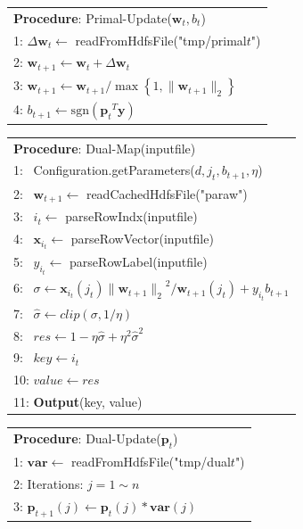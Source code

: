 \documentclass[10pt, conference, compsocconf]{IEEEtran}
\newcommand{\bw}{\mathbf{w}}
\newcommand{\bp}{\mathbf{p}}
\newcommand{\lc}{\left(}
\newcommand{\rc}{\right)}
\newcommand{\tspace}{\hspace*{2em}}
\def\sgn{\mathrm{sgn}}
\begin{document}
    \begin{table}[ht]
	\begin{tabular}{l}
	\hline\noalign{\smallskip}
	\textbf{Procedure}: Primal-Update($\bw_t, b_t$) \\
	\noalign{\smallskip}
	\hline
	\noalign{\smallskip}
    1:  $\Delta \bw_t \leftarrow$ readFromHdfsFile("tmp/primal$t$") \\
    2:  $\bw_{t+1} \leftarrow \bw_t+\Delta \bw_t$ \\
	3:	${\bw}_{t+1}\leftarrow {\bw}_{t+1}/\max \left\{1,\|{\bw}_{t+1}\|_2 \right\}$ \\
    4:  ${b}_{t+1}\leftarrow \sgn\lc {{\bp}_{t}}^{T}\mathbf{y}\rc$ \\
	\hline
	\end{tabular}
	\end{table}
    \begin{table}[ht]
	\begin{tabular}{l}
	\hline\noalign{\smallskip}
	\textbf{Procedure}: Dual-Map(inputfile) \\
	\noalign{\smallskip}
	\hline
	\noalign{\smallskip}
    1:  ~Configuration.getParameters($d, j_t, b_{t+1}, \eta$) \\
    2:  ~$\bw_{t+1} \leftarrow$ readCachedHdfsFile("paraw") \\
    3:  ~$i_t \leftarrow$ parseRowIndx(inputfile)\\
    4:  ~$\mathbf{x}_{i_t} \leftarrow$ parseRowVector(inputfile) \\
    5:  ~$y_{i_t} \leftarrow$ parseRowLabel(inputfile) \\
    6:  ~$\sigma \leftarrow \mathbf{x}_{i_t} \lc {j}_{t}\rc{\|{\bw}_{t+1}\|_2}^{2}/{\bw}_{t+1}\lc {j}_{t} \rc+{y}_{i_t}{b}_{t+1}$ \\
	7:	~$\hat{\sigma} \leftarrow clip\lc \sigma,1/\eta \rc$ \\
	8:	~$res \leftarrow 1-\eta\hat{\sigma} + {\eta}^{2}{\hat{\sigma}}^{2} $ \\
    9:  ~$key \leftarrow i_t$ \\
    10: $value \leftarrow res $ \\
    11: \textbf{Output}(key, value) \\
	\hline
	\end{tabular}
	\end{table}
    \begin{table}[ht]
	\begin{tabular}{l}
	\hline\noalign{\smallskip}
	\textbf{Procedure}: Dual-Update($\bp_t$) \\
	\noalign{\smallskip}
	\hline
	\noalign{\smallskip}
    1:  $\mathbf{var} \leftarrow$ readFromHdfsFile("tmp/dual$t$") \\
    2:  Iterations: $j=1 \sim n$ \\
    3:  \tspace $\bp_{t+1}(j) \leftarrow \bp_t(j)*\mathbf{var}(j)$ \\
	\hline
	\end{tabular}
	\end{table}
\end{document}
